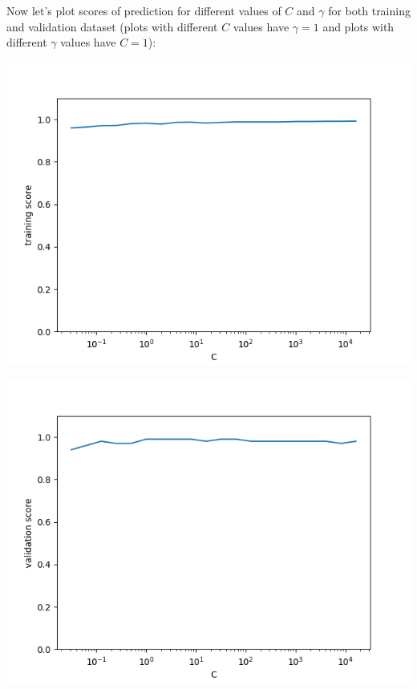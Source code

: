 \documentclass[a4paper]{article}
\begin{document}
	Now let's plot scores of prediction for different values of $C$ and $\gamma$ for both training and validation dataset (plots with different $C$ values have $\gamma=1$ and plots with different $\gamma$ values have $C=1$):
	
	\centerline{\includegraphics[width=1\textwidth]{dataset_1_train_C_scores}}  
	
	\centerline{\includegraphics[width=1\textwidth]{dataset_1_validation_C_scores}}  
	
\end{document}
